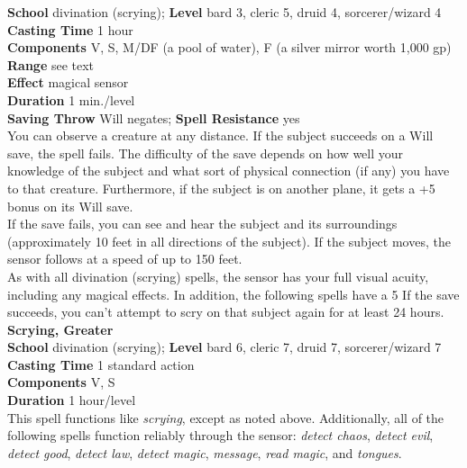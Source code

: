 \textbf{School} divination (scrying); \textbf{Level} bard 3, cleric 5, druid 4, sorcerer/wizard 4\\
\textbf{Casting Time} 1 hour\\
\textbf{Components} V, S, M/DF (a pool of water), F (a silver mirror worth 1,000 gp)\\
\textbf{Range} see text\\
\textbf{Effect }magical sensor\\
\textbf{Duration} 1 min./level\\
\textbf{Saving Throw} Will negates; \textbf{Spell Resistance} yes\\
You can observe a creature at any distance. If the subject succeeds on a Will save, the spell fails. The difficulty of the save depends on how well your knowledge of the subject and what sort of physical connection (if any) you have to that creature. Furthermore, if the subject is on another plane, it gets a +5 bonus on its Will save.\\
If the save fails, you can see and hear the subject and its surroundings (approximately 10 feet in all directions of the subject). If the subject moves, the sensor follows at a speed of up to 150 feet.\\
As with all divination (scrying) spells, the sensor has your full visual acuity, including any magical effects. In addition, the following spells have a 5%
If the save succeeds, you can't attempt to scry on that subject again for at least 24 hours.\\
\textbf{Scrying, Greater}\\
\textbf{School} divination (scrying); \textbf{Level} bard 6, cleric 7, druid 7, sorcerer/wizard 7\\
\textbf{Casting Time} 1 standard action\\
\textbf{Components} V, S\\
\textbf{Duration} 1 hour/level\\
This spell functions like \textit{scrying}, except as noted above. Additionally, all of the following spells function reliably through the sensor: \textit{detect chaos}, \textit{detect evil}, \textit{detect good}, \textit{detect law}, \textit{detect magic}, \textit{message}, \textit{read magic}, and \textit{tongues}.\\
